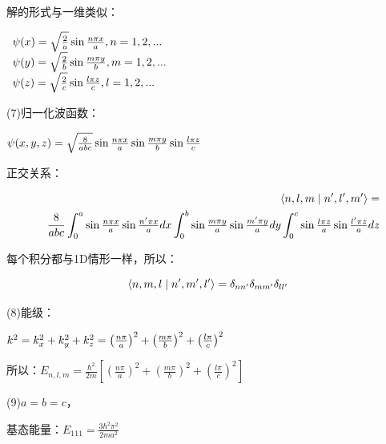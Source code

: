 解的形式与一维类似：

$\begin{array}{l}
 \psi (x) = \sqrt {{\textstyle{2 \over a}}} \sin {\textstyle{{n\pi x} \over a}},n = 1,2,... \\
 \psi (y) = \sqrt {{\textstyle{2 \over b}}} \sin {\textstyle{{m\pi y} \over b}},m = 1,2,... \\
 \psi (z) = \sqrt {{\textstyle{2 \over c}}} \sin {\textstyle{{l\pi z} \over c}},l = 1,2,... \\
 \end{array}$

(7)归一化波函数：

$\psi (x,y,z) = \sqrt {{\textstyle{8 \over {abc}}}} \sin {\textstyle{{n\pi x} \over a}}\sin {\textstyle{{m\pi y} \over b}}\sin {\textstyle{{l\pi z} \over c}}$

正交关系：

\begin{eqnarray*}
{} & {} & \left\langle {{n,l,m}}
 \mathrel{\left | {\vphantom {{n,l,m} {n',l',m'}}}
 \right. \kern-\nulldelimiterspace}
 {{n',l',m'}} \right\rangle  =  \\
{} & {} &  \frac{8}{{abc}}\int_0^a {\sin {\textstyle{{n\pi x} \over a}}\sin {\textstyle{{n'\pi x} \over a}}dx\int_0^b {\sin {\textstyle{{m\pi y} \over a}}\sin {\textstyle{{m'\pi y} \over a}}dy} } \int_0^c {\sin {\textstyle{{l\pi z} \over a}}\sin {\textstyle{{l'\pi z} \over a}}dz} 
\end{eqnarray*}

每个积分都与1D情形一样，所以：

\begin{equation*}
\left\langle {{n,m,l}}
 \mathrel{\left | {\vphantom {{n,m,l} {n',m',l'}}}
 \right. \kern-\nulldelimiterspace}
 {{n',m',l'}} \right\rangle  = \delta _{nn'} \delta _{mm'} \delta _{ll'} 
 \end{equation*}

(8)能级：

$k^2  = k_x ^2  + k_y ^2  + k_z ^2  = \left( {{\textstyle{{n\pi } \over a}}} \right)^2  + \left( {{\textstyle{{m\pi } \over b}}} \right)^2  + \left( {{\textstyle{{l\pi } \over c}}} \right)^2 $

所以：$E_{n,l,m}  = \frac{{\hbar ^2 }}{{2m}}\left[ {\left( {\frac{{n\pi }}{a}} \right)^2  + \left( {\frac{{m\pi }}{b}} \right)^2  + \left( {\frac{{l\pi }}{c}} \right)^2 } \right]$

(9)$a=b=c$，

基态能量：$E_{111}  = \frac{{3\hbar ^2 \pi ^2 }}{{2ma^2 }}$

